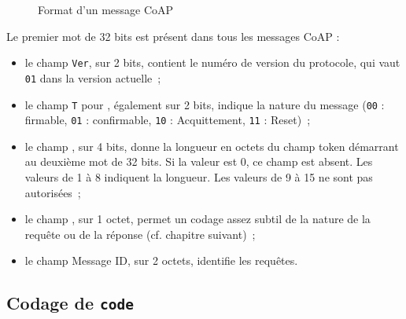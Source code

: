 \begin{figure}
\caption{Format d'un message CoAP} 
\label{fig-CoAP-msg} 
\end{figure} 	


Le premier mot de 32 bits est présent dans tous les messages CoAP :

\begin{itemize}
    \item le champ \texttt{Ver}, sur 2 bits, contient le numéro de version du protocole, qui vaut \texttt{01} dans la version actuelle~;
    \item le champ \texttt{T} pour \textit{}, également sur 2 bits, indique la nature du message (\texttt{00} : firmable, \texttt{01} :  confirmable, \texttt{10} : Acquittement, \texttt{11} : Reset)~;
    \item le champ \texttt{}, sur 4 bits, donne la longueur en octets du champ token démarrant au deuxième mot de 32 bits. Si la valeur est 0, ce champ est absent. Les valeurs de 1 à 8 indiquent la longueur. Les valeurs de 9 à 15 ne sont pas autorisées~;
    \item le champ \texttt{}, sur 1 octet, permet un codage assez subtil de la nature de la requête ou de la réponse (cf. chapitre suivant)~;
    \item le champ Message ID, sur 2 octets, identifie les requêtes.
\end{itemize}

\subsection{Codage de \texttt{code}}

